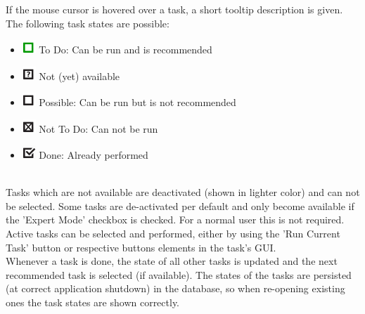 If the mouse cursor is hovered over a task, a short tooltip description is given. \\

The following task states are possible:

\begin{itemize}
 \item \includegraphics[width=0.5cm]{../../data/icons/todo.png} To Do: Can be run and is recommended
 \item \includegraphics[width=0.5cm]{../../data/icons/todo_maybe.png} Not (yet) available
 \item \includegraphics[width=0.5cm]{../../data/icons/not_recommended.png} Possible: Can be run but is not recommended
 \item \includegraphics[width=0.5cm]{../../data/icons/not_todo.png} Not To Do: Can not be run
 \item \includegraphics[width=0.5cm]{../../data/icons/done.png} Done: Already performed
\end{itemize}
\  \\

Tasks which are not available are deactivated (shown in lighter color) and can not be selected. Some tasks are de-activated per default and only become available if the 'Expert Mode' checkbox is checked. For a normal user this is not required.\\

Active tasks can be selected and performed, either by using the 'Run Current Task' button or respective buttons elements in the task's GUI. \\

Whenever a task is done, the state of all other tasks is updated and the next recommended task is selected (if available). The states of the tasks are persisted (at correct application shutdown) in the database, so when re-opening existing ones the task states are shown correctly. \\

